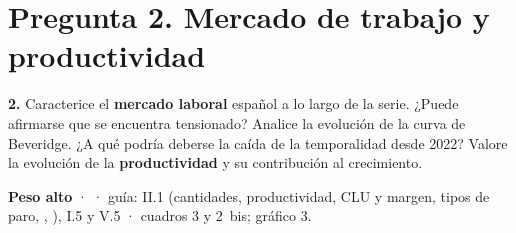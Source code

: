 \clearpage
\section*{Pregunta 2. Mercado de trabajo y productividad}

\begin{enunciado}
\textbf{2.} Caracterice el \textbf{mercado laboral} español a lo largo de la serie. ¿Puede afirmarse que se encuentra tensionado? Analice la evolución de la curva de Beveridge. ¿A qué podría deberse la caída de la temporalidad desde 2022? Valore la evolución de la \textbf{productividad} y su contribución al crecimiento.

\smallskip
\textbf{Peso alto} ·  · guía: II.1 (cantidades, productividad, CLU y margen, tipos de paro, , ), I.5 y V.5 · cuadros 3 y 2~bis; gráfico 3.
\end{enunciado}

